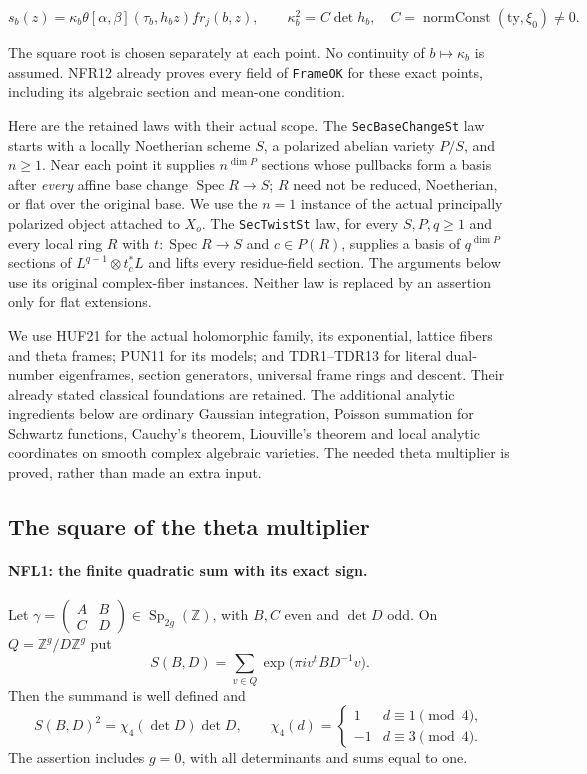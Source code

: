 \documentclass[11pt,a4paper]{article}
\numberwithin{equation}{section}
\theoremstyle{remark}\newtheorem{remark}[theorem]{Remark}
\begin{document}
\[
 s_b(z)=\kappa_b\theta[\alpha,\beta](\tau_b,h_bz)fr_j(b,z),
 \qquad \kappa_b^2=C\det h_b,
 \quad C=\operatorname{normConst}(\mathrm{ty},\xi_0)\ne0.
 \tag{NFL.2}
\]

The square root is chosen separately at each point.  No continuity
of $b\mapsto\kappa_b$ is assumed.  NFR12 already proves every field
of \texttt{Frame\allowbreak OK} for these exact points, including its algebraic
section and mean-one condition.

Here are the retained laws with their actual scope.  The
\texttt{Sec\allowbreak Base\allowbreak Change\allowbreak St} law starts with a locally Noetherian scheme
$S$, a polarized abelian variety $P/S$, and $n\ge1$.  Near each
point it supplies $n^{\dim P}$ sections whose pullbacks form a basis
after \emph{every} affine base change $\operatorname{Spec}R\to S$;
$R$ need not be reduced, Noetherian, or flat over the original base.
We use the $n=1$ instance of the actual principally polarized object
attached to $X_o$.  The \texttt{Sec\allowbreak Twist\allowbreak St} law, for every $S,P,q\ge1$
and every local ring $R$ with $t:\operatorname{Spec}R\to S$ and
$c\in P(R)$, supplies a basis of $q^{\dim P}$ sections of
$L^{q-1}\otimes t_c^*L$ and lifts every residue-field section.
The arguments below use its original complex-fiber instances.
Neither law is replaced by an assertion only for flat extensions.

We use HUF21 for the actual holomorphic family, its exponential,
lattice fibers and theta frames; PUN11 for its models; and TDR1--TDR13
for literal dual-number eigenframes, section generators, universal
frame rings and descent.  Their already stated classical foundations
are retained.  The additional analytic ingredients below are ordinary
Gaussian integration, Poisson summation for Schwartz functions,
Cauchy's theorem, Liouville's theorem and local analytic coordinates
on smooth complex algebraic varieties.  The needed theta multiplier
is proved, rather than made an extra input.

\subsection{The square of the theta multiplier}

\paragraph{NFL1: the finite quadratic sum with its exact sign.}
\label{claim:NFL1}
Let $\gamma=\left(\begin{smallmatrix}A&B\\ C&D\end{smallmatrix}\right)
\in\operatorname{Sp}_{2g}(\mathbb Z)$, with $B,C$ even and $\det D$
odd.  On $Q=\mathbb Z^g/D\mathbb Z^g$ put
\[
 S(B,D)=\sum_{v\in Q}\exp\bigl(\pi i v^tBD^{-1}v\bigr).
\]
Then the summand is well defined and
\[
 S(B,D)^2=\chi_4(\det D)\det D,
 \qquad
 \chi_4(d)=\begin{cases}1&d\equiv1\pmod4,\\-1&d\equiv3\pmod4.
 \end{cases}
 \tag{NFL.3}
\]
The assertion includes $g=0$, with all determinants and sums equal
to one.
\end{document}
